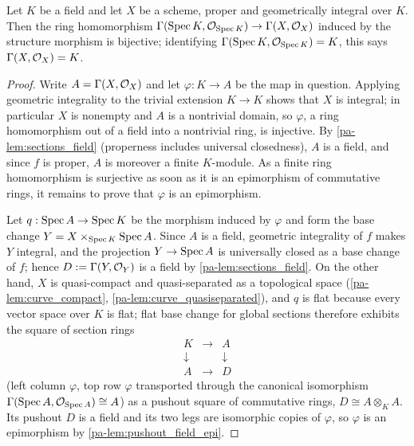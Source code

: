 \begin{theorem}
  \label{pa-thm:sections_k}
  \leanok

  Let \(K\) be a field and let \(X\) be a scheme, proper and geometrically integral over
  \(K\). Then the ring homomorphism
  \(\Gamma(\operatorname{Spec} K, \mathcal{O}_{\operatorname{Spec} K}) \to \Gamma(X, \mathcal{O}_{X})\) induced by the structure
  morphism is bijective; identifying \(\Gamma(\operatorname{Spec} K, \mathcal{O}_{\operatorname{Spec} K}) = K\), this says
  \(\Gamma(X, \mathcal{O}_{X}) = K\).
\end{theorem}
\begin{proof}
  \leanok
  Write \(A = \Gamma(X, \mathcal{O}_{X})\) and let \(\varphi : K \to A\) be the map in question.
  Applying geometric integrality to the trivial extension \(K \to K\) shows that \(X\) is
  integral; in particular \(X\) is nonempty and \(A\) is a nontrivial domain, so \(\varphi\),
  a ring homomorphism out of a field into a nontrivial ring, is injective. By
  \ref{pa-lem:sections_field} (properness includes universal closedness), \(A\) is a field, and
  since \(f\) is proper, \(A\) is moreover a finite \(K\)-module. As a finite ring
  homomorphism is surjective as soon as it is an epimorphism of commutative rings, it remains
  to prove that \(\varphi\) is an epimorphism.

  Let \(q : \operatorname{Spec} A \to \operatorname{Spec} K\) be the morphism induced by \(\varphi\) and form the base
  change \(Y = X \times_{\operatorname{Spec} K} \operatorname{Spec} A\). Since \(A\) is a field, geometric integrality of
  \(f\) makes \(Y\) integral, and the projection \(Y \to \operatorname{Spec} A\) is universally closed as a
  base change of \(f\); hence \(D := \Gamma(Y, \mathcal{O}_{Y})\) is a field by
  \ref{pa-lem:sections_field}. On the other hand, \(X\) is quasi-compact and quasi-separated as
  a topological space (\ref{pa-lem:curve_compact}, \ref{pa-lem:curve_quasiseparated}), and \(q\) is
  flat because every vector space over \(K\) is flat; flat base change for global sections
  therefore exhibits the square of section rings
  \[
    \begin{array}{ccc}
      K & \longrightarrow & A \\
      \downarrow & & \downarrow \\
      A & \longrightarrow & D
    \end{array}
  \]
  (left column \(\varphi\), top row \(\varphi\) transported through the canonical isomorphism
  \(\Gamma(\operatorname{Spec} A, \mathcal{O}_{\operatorname{Spec} A}) \cong A\)) as a pushout square of commutative rings,
  \(D \cong A \otimes_K A\). Its pushout \(D\) is a field and its two legs are isomorphic
  copies of \(\varphi\), so \(\varphi\) is an epimorphism by \ref{pa-lem:pushout_field_epi}.
\end{proof}

